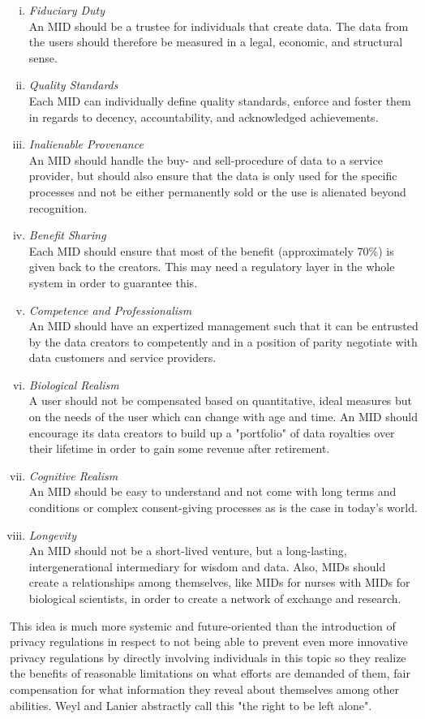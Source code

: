 \documentclass[a4paper,12pt]{report}
\begin{document}
		\begin{enumerate}[(i)]
			\item \textit{Fiduciary Duty} \\
			An MID should be a trustee for individuals that create data. The data from the users should therefore be measured in a legal, economic, and structural sense.
			\item \textit{Quality Standards} \\
			Each MID can individually define quality standards, enforce and foster them in regards to decency, accountability, and acknowledged achievements.
			\item \textit{Inalienable Provenance} \\
			An MID should handle the buy- and sell-procedure of data to a service provider, but should also ensure that the data is only used for the specific processes and not be either permanently sold or the use is alienated beyond recognition.
			\item \textit{Benefit Sharing} \\
			Each MID should ensure that most of the benefit (approximately 70\%) is given back to the creators. This may need a regulatory layer in the whole system in order to guarantee this.
			\item \textit{Competence and Professionalism} \\
			An MID should have an expertized management such that it can be entrusted by the data creators to competently and in a position of parity negotiate with data customers and service providers.
			\item \textit{Biological Realism} \\
			A user should not be compensated based on quantitative, ideal measures but on the needs of the user which can change with age and time. An MID should encourage its data creators to build up a "portfolio" of data royalties over their lifetime in order to gain some revenue after retirement.
			\item \textit{Cognitive Realism} \\
			An MID should be easy to understand and not come with long terms and conditions or complex consent-giving processes as is the case in today's world.
			\item \textit{Longevity} \\
			An MID should not be a short-lived venture, but a long-lasting, intergenerational intermediary for wisdom and data. Also, MIDs should create a relationships among themselves, like MIDs for nurses with MIDs for biological scientists, in order to create a network of exchange and research.
		\end{enumerate}
		This idea is much more systemic and future-oriented than the introduction of privacy regulations in respect to not being able to prevent even more innovative privacy regulations by directly involving individuals in this topic so they realize the benefits of reasonable limitations on what efforts are demanded of them, fair compensation for what information they reveal about themselves among other abilities. Weyl and Lanier abstractly call this "the right to be left alone".
	\closesection
	
	
	\newpage
	\printbibliography
\end{document}
